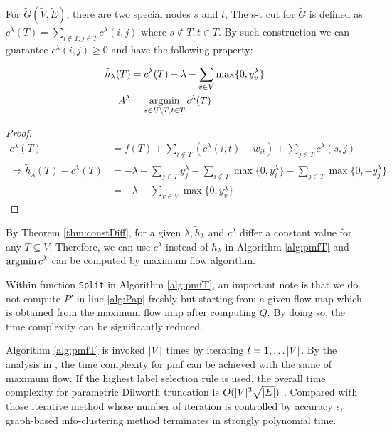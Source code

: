 \documentclass{article}
\begin{document}
For $\widetilde{G}(\widetilde{V}, \widetilde{E})$, there are two special nodes $s$ and $t$, The s-t cut for $\widetilde{G}$
is defined as $c^{\lambda}(T) = \sum_{i \not\in T, j \in T} c^{\lambda}(i,j)$ where $s \not\in T, t \in T$. By such construction we can guarantee $c^{\lambda}(i,j)\geq 0$ and have the following property:
\begin{theorem}\label{thm:constDiff}
	\begin{align}
		\tilde{h}_{\lambda}(T) &= c^{\lambda}(T) - \lambda - \sum_{v \in V} \max\{0, y^{\lambda}_v\}\\
	A^{\lambda}	&= \operatorname*{argmin}_{s\in U\backslash T, t\in T}c^{\lambda}(T) \label{eq:pmqe}
	\end{align}
\end{theorem}
\begin{proof}
	
	\begin{align*}
	c^{\lambda}(T) &= f(T) + \sum_{i \not\in T} (c^{\lambda}(i, t) - w_{it})+ \sum_{j \in T} c^{\lambda}(s,j) \\
	\Rightarrow \tilde{h}_{\lambda}(T) - c^{\lambda}(T) &= -\lambda - \sum_{j \in T} y^{\lambda}_j - \sum_{i \not\in T} \max\{0, y^{\lambda}_i\} - \sum_{j \in T} \max\{0,-y^{\lambda}_j\}\\
	&= -\lambda - \sum_{v \in V} \max\{0, y^{\lambda}_v\}
	\end{align*}
\end{proof}

By Theorem \ref{thm:constDiff}, for a given $\lambda, \tilde{h}_{\lambda}$ and $c^{\lambda}$ differ a constant value for any $T\subseteq V$. Therefore, we can use $c^{\lambda}$ instead of $\tilde{h}_{\lambda}$ in Algorithm \ref{alg:pmfT} and $\operatorname*{argmin} c^{\lambda}$ can be computed by maximum flow algorithm. 

Within function \texttt{Split} in Algorithm \ref{alg:pmfT}, an important note is that we do not compute $P'$ in line \ref{alg:Pap} freshly but starting from a given flow map which is obtained from the maximum flow map after computing $Q$. By doing so, the time complexity can be significantly reduced.

Algorithm \ref{alg:pmfT} is invoked $\lvert V\rvert$ times by iterating $t=1,\dots \lvert V\rvert$. By the analysis in \cite{RN17}, the time complexity for \textsf{pmf} can be achieved with the same of maximum flow. If the highest label selection rule is used, the overall time complexity for parametric Dilworth truncation is $O(\lvert V\rvert^3\sqrt{\lvert E\rvert})$ \cite{RN9}. Compared with those iterative method whose number of iteration is controlled by accuracy $\epsilon$, graph-based info-clustering method terminates in strongly polynomial time.
\end{document}

